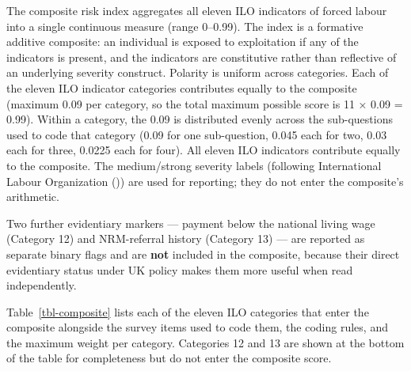 \documentclass[
  12pt,
  letterpaper,
  DIV=11,
  numbers=noendperiod]{scrreprt}
\begin{document}
The composite risk index aggregates all eleven ILO indicators of forced
labour into a single continuous measure (range 0--0.99). The index is a
formative additive composite: an individual is exposed to exploitation
if any of the indicators is present, and the indicators are constitutive
rather than reflective of an underlying severity construct. Polarity is
uniform across categories. Each of the eleven ILO indicator categories
contributes equally to the composite (maximum 0.09 per category, so the
total maximum possible score is 11 × 0.09 = 0.99). Within a category,
the 0.09 is distributed evenly across the sub-questions used to code
that category (0.09 for one sub-question, 0.045 each for two, 0.03 each
for three, 0.0225 each for four). All eleven ILO indicators contribute
equally to the composite. The medium/strong severity labels (following
International Labour Organization ()) are
used for reporting; they do not enter the composite's arithmetic.

Two further evidentiary markers --- payment below the national living
wage (Category 12) and NRM-referral history (Category 13) --- are
reported as separate binary flags and are \textbf{not} included in the
composite, because their direct evidentiary status under UK policy makes
them more useful when read independently.

Table~\ref{tbl-composite} lists each of the eleven ILO categories that
enter the composite alongside the survey items used to code them, the
coding rules, and the maximum weight per category. Categories 12 and 13
are shown at the bottom of the table for completeness but do not enter
the composite score.
\end{document}
